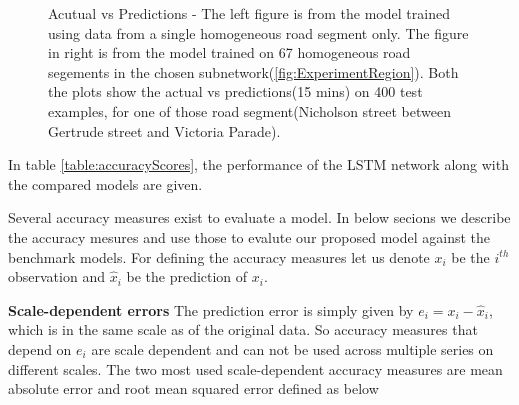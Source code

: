 \begin{figure}[h]
    \centering

    \qquad

    \caption[Acutual vs Predictions, using deep LSTM networks]{Acutual vs Predictions - The left
    figure is from the model trained using data from a single homogeneous road segment only. The
    figure in right is from the model trained on 67 homogeneous road segements in the chosen
    subnetwork(\ref{fig:ExperimentRegion}). Both the plots show the actual vs predictions(15
    mins) on 400 test examples, for one of those road segment(Nicholson street between Gertrude
    street and Victoria Parade).}
    \label{fig:LSTMActualPredicted}
\end{figure}

In table \ref{table:accuracyScores}, the performance of the LSTM network along with the compared
models are given.

Several accuracy measures exist to evaluate a model. In below secions we describe
the accuracy mesures and use those to evalute our proposed model against the benchmark models.
For defining the accuracy measures let us denote $x_{i}$ be the $i^{th}$ observation and
$\hat{x}_{i}$ be the prediction of $x_{i}$.

\textbf{Scale-dependent errors}
The prediction error is simply given by $e_{i} = x_{i} - \hat{x}_{i}$, which is in the same scale
as of the original data. So accuracy measures that depend on $e_{i}$ are scale dependent and can
not be used across multiple series on different scales. The two most used scale-dependent
accuracy measures are mean absolute error and root mean squared error defined as below

